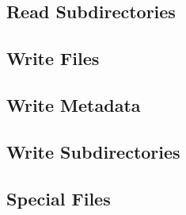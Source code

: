 \subsection{Read Subdirectories}
\label{sec-implementation-readsubdirs}

\subsection{Write Files}
\label{sec-implementation-writefiles}

\subsection{Write Metadata}
\label{sec-implementation-writemeta}

\subsection{Write Subdirectories}
\label{sec-implementation-writesubdirs}

\subsection{Special Files}
\label{sec-implementation-special}
